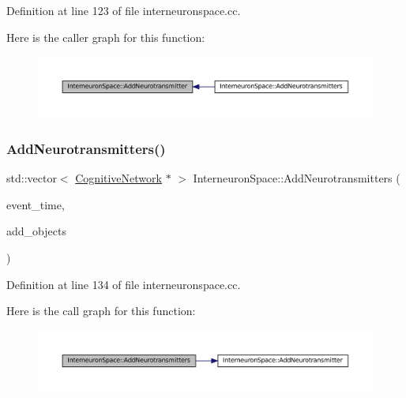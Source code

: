 Definition at line 123 of file interneuronspace.\+cc.

Here is the caller graph for this function\+:\nopagebreak
\begin{figure}[H]
\begin{center}
\leavevmode
\includegraphics[width=350pt]{class_interneuron_space_afee7374310b2a8c08bac232d62ea7aa1_icgraph}
\end{center}
\end{figure}
\mbox{\label{class_interneuron_space_a1049397cd511c753d8c178db8f68a1a7}} 
\subsubsection{\texorpdfstring{Add\+Neurotransmitters()}{AddNeurotransmitters()}}
{\footnotesize\ttfamily std\+::vector$<$ \mbox{\hyperlink{class_cognitive_network}{Cognitive\+Network}} $\ast$ $>$ Interneuron\+Space\+::\+Add\+Neurotransmitters (\begin{DoxyParamCaption}\item[{std\+::chrono\+::time\+\_\+point$<$ \mbox{\hyperlink{universe_8h_a0ef8d951d1ca5ab3cfaf7ab4c7a6fd80}{Clock}} $>$}]{event\+\_\+time,  }\item[{std\+::vector$<$ \mbox{\hyperlink{class_cognitive_network}{Cognitive\+Network}} $\ast$$>$}]{add\+\_\+objects }\end{DoxyParamCaption})}



Definition at line 134 of file interneuronspace.\+cc.

Here is the call graph for this function\+:\nopagebreak
\begin{figure}[H]
\begin{center}
\leavevmode
\includegraphics[width=350pt]{class_interneuron_space_a1049397cd511c753d8c178db8f68a1a7_cgraph}
\end{center}
\end{figure}
\mbox{\label{class_interneuron_space_a96149bba4c6efd03586700a6fe86960a}} 
